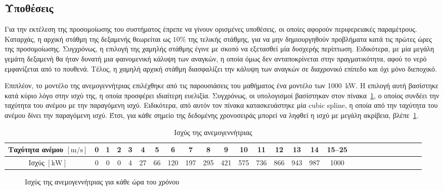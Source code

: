\subsection{Υποθέσεις}
Για την εκτέλεση της προσομοίωσης του συστήματος έπρεπε να γίνουν ορισμένες
υποθέσεις, οι οποίες αφορούν περιφερειακές παραμέτρους. Καταρχάς, η αρχική
στάθμη της δεξαμενής θεωρείται ως \(10\%\) της τελικής στάθμης, για να μην
δημιουργηθούν προβλήματα κατά τις πρώτες ώρες της προσομοίωσης. Συγχρόνως, η
επιλογή της χαμηλής στάθμης έγινε με σκοπό να εξετασθεί μία δυσχερής περίπτωση.
Ειδικότερα, με μία μεγάλη γεμάτη δεξαμενή θα ήταν δυνατή μια φαινομενική κάλυψη
των αναγκών, η οποία όμως δεν ανταποκρίνεται στην πραγματικότητα, αφού το νερό
εμφανίζεται από το πουθενά. Τέλος, η χαμηλή αρχική στάθμη διασφαλίζει την
κάλυψη των αναγκών σε διαχρονικό επίπεδο και όχι μόνο διεποχικό.

Επιπλέον, το μοντέλο της ανεμογεννήτριας επιλέχθηκε από τις παρουσιάσεις του
μαθήματος ένα μοντέλο των \qty{1000}{\kilo\watt}. Η επιλογή αυτή βασίστηκε κατά
κύριο λόγο στην ισχύ της, η οποία προσφέρει ιδιαίτερη ευελιξία. Συγχρόνως, οι
υπολογισμοί βασίστηκαν στον πίνακα~\ref{tab:wind_turbine_data}, ο οποίος συνδέει την ταχύτητα του ανέμου με
την παραγόμενη ισχύ. Ειδικότερα, από αυτόν τον πίνακα κατασκευάστηκε μία cubic
spline, η οποία από την ταχύτητα του ανέμου δίνει την παραγόμενη ισχύ. Έτσι,
για κάθε σημείο της δεδομένης χρονοσειράς μπορεί να ληφθεί η ισχύ με μεγάλη
ακρίβεια, βλέπε~\ref{fig:wt_power_curve}.

\begin{table}[ht]
	\centering
	\caption{Ισχύς της ανεμογεννήτριας}\label{tab:wind_turbine_data}
	\footnotesize
	\begin{tabular}[H]{@{}ccccccccccccccccccccccccccc@{}}
		\toprule
		Ταχύτητα ανέμου \(\left[\si{\meter\per\second}\right]\) & 0 & 1 & 2 & 3 & 4  & 5  & 6   & 7   & 8   & 9   & 10  & 11  & 12  & 13  & 14  & 15--25 \\ \midrule \midrule
		Ισχύς \(\left[\si{\kilo\watt}\right]\)                  & 0 & 0 & 0 & 4 & 27 & 66 & 120 & 197 & 295 & 421 & 575 & 736 & 866 & 943 & 987 & 1000   \\ \bottomrule
	\end{tabular}
\end{table}

\begin{figure}[ht]
	\centering
	\caption{Ισχύς της ανεμογεννήτριας για κάθε ώρα του χρόνου}\label{fig:wt_power_curve}
\end{figure}

